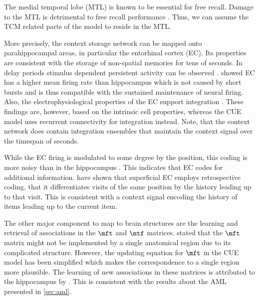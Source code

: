 The medial temporal lobe (MTL) is known to be essential for free recall.
Damage to the MTL is detrimental to free recall performance \parencite{graf1984}.
Thus, we can assume the TCM related parts of the model to reside in the MTL\@.

More precisely, the context storage network can be mapped  onto parahippocampal areas, in particular the entorhinal cortex (EC).
Its properties are consistent with the storage of non-spatial memories for tens of seconds.
In delay periods stimulus dependent persistent activity can be observed \parencite{suzuki1997,young1997}.
\Textcite{quirk1992} showed EC has a higher mean firing rate than hippocampus which is not caused by short bursts and is thus compatible with the sustained maintenance of neural firing.
Also, the electrophysiological properties of the EC support integration \parencite{egorov2002}.
These findings are, however, based on the intrinsic cell properties, whereas the CUE model uses recurrent connectivity for integration instead.
Note, that the context network does contain integration ensembles that maintain the context signal over the timespan of seconds.

While the EC firing is modulated to some degree by the position, this coding is more noisy than in the hippocampus \parencite{quirk1992}.
This indicates that EC codes for additional information.
\Textcite{Frank2000} have shown that superficial EC employs retrospective coding, that it differentiates visits of the same position by the history leading up to that visit.
This is consistent with a context signal encoding the history of items leading up to the current item.

The other major component to map to brain structures are the learning and retrieval of associations in the $\mft$ and $\mtf$ matrices.
\Textcite{howard2005} stated that the $\mft$ matrix might not be implemented by a single anatomical region due to its complicated structure.
However, the updating equation for $\mft$ in the CUE model has been simplified which makes the correspondence to a single region more plausible.
The learning of new associations in these matrices is attributed to the hippocampus by \textcite{howard2005}.
This is consistent with the results about the AML presented in \cref{sec:aml}.


